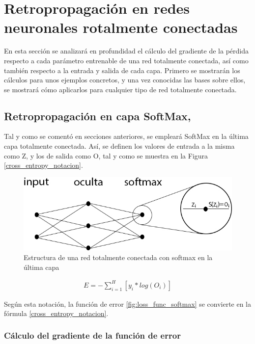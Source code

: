 \section{Retropropagación en redes neuronales rotalmente conectadas}

En esta sección se analizará en profundidad el cálculo del gradiente de la pérdida respecto a cada parámetro entrenable de una red totalmente conectada, así como también respecto a la entrada y salida de cada capa. Primero se mostrarán los cálculos para unos ejemplos concretos, y una vez conocidas las bases sobre ellos, se mostrará cómo aplicarlos para cualquier tipo de red totalmente conectada. 

\subsection{Retropropagación en capa SoftMax, \cite{Cross_entropy_backprop} \cite{Cross_entropy_backprop_grad_input}} 

Tal y como se comentó en secciones anteriores, se empleará SoftMax en la última capa totalmente conectada. Así, se definen los valores de entrada a la misma como Z, y los de salida como O, tal y como se muestra en la Figura \ref{cross_entropy_notacion}.

\begin{figure}[H]
	\centering
	\includegraphics[scale=0.4]{imagenes/NN_softmax.jpg}  
	\caption{Estructura de una red totalmente conectada con softmax en la última capa}
\end{figure}

\begin{gather}
	E = - \sum_{i=1}^{H}  [y_i * log(O_i)] 
	\label{cross_entropy_notacion}
\end{gather}

Según esta notación, la función de error \ref{fig:loss_func_softmax} se convierte en la fórmula \ref{cross_entropy_notacion}.

\subsubsection{Cálculo del gradiente de la función de error}

